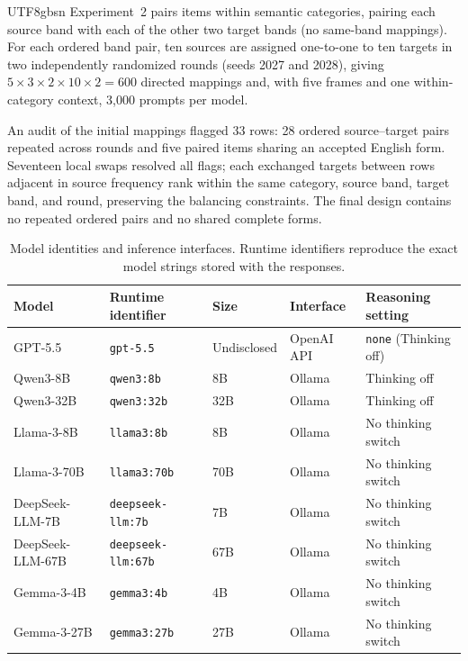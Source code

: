 \documentclass[11pt]{article}
\begin{document}
\begin{CJK*}{UTF8}{gbsn}
Experiment~2 pairs items within semantic categories, pairing each source band with each of the other two target bands (no same-band mappings). For each ordered band pair, ten sources are assigned one-to-one to ten targets in two independently randomized rounds (seeds 2027 and 2028), giving $5 \times 3 \times 2 \times 10 \times 2 = 600$ directed mappings and, with five frames and one within-category context, 3,000 prompts per model.

\label{app:overlap-adjustment}
An audit of the initial mappings flagged 33 rows: 28 ordered source--target pairs repeated across rounds and five paired items sharing an accepted English form. Seventeen local swaps resolved all flags; each exchanged targets between rows adjacent in source frequency rank within the same category, source band, target band, and round, preserving the balancing constraints. The final design contains no repeated ordered pairs and no shared complete forms.

\begin{table}[t]
  \centering
  \small
  \setlength{\tabcolsep}{5pt}
  \begin{tabular}{@{}>{\raggedright\arraybackslash}p{2.90cm}>{\raggedright\arraybackslash}p{3.60cm}>{\raggedright\arraybackslash}p{2.10cm}>{\raggedright\arraybackslash}p{2.40cm}>{\raggedright\arraybackslash}p{3.00cm}@{}}
    \hline
    \textbf{Model} & \textbf{Runtime identifier} & \textbf{Size} & \textbf{Interface} & \textbf{Reasoning setting} \\
    \hline
    GPT-5.5 & \texttt{gpt-5.5} & Undisclosed & OpenAI API & \texttt{none} (Thinking off) \\
    Qwen3-8B & \texttt{qwen3:8b} & 8B & Ollama & Thinking off \\
    Qwen3-32B & \texttt{qwen3:32b} & 32B & Ollama & Thinking off \\
    Llama-3-8B & \texttt{llama3:8b} & 8B & Ollama & No thinking switch \\
    Llama-3-70B & \texttt{llama3:70b} & 70B & Ollama & No thinking switch \\
    DeepSeek-LLM-7B & \texttt{deepseek-llm:7b} & 7B & Ollama & No thinking switch \\
    DeepSeek-LLM-67B & \texttt{deepseek-llm:67b} & 67B & Ollama & No thinking switch \\
    Gemma-3-4B & \texttt{gemma3:4b} & 4B & Ollama & No thinking switch \\
    Gemma-3-27B & \texttt{gemma3:27b} & 27B & Ollama & No thinking switch \\
    \hline
  \end{tabular}
  \caption{Model identities and inference interfaces. Runtime identifiers reproduce the exact model strings stored with the responses.}
  \label{tab:model-runtime-identifiers}
\end{table}


\end{CJK*}
\end{document}
